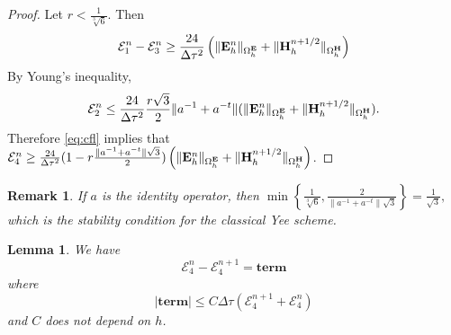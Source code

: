 \documentclass[12pt,reqno]{amsart}
\newcommand{\e}{{\bf E}}
\newcommand{\h}{{\bf H}}
\newtheorem{lem}[theorem]{Lemma}
\newtheorem{remark}[theorem]{Remark}
\theoremstyle{definition}
\numberwithin{equation}{section}
\def\Gwh{\Omega_h}
\begin{document}
\begin{proof}
Let $r<\frac{1}{\sqrt[3]{6}}$.
Then $$\mathcal{E}_1^n-\mathcal{E}_3^n\geq
\frac{24}{\Delta \tau^2}\left ( \|\e_h^n\|_{\Gwh^\e}+\|\h_h^{n+1/2}\|_{\Gwh^\h}\right)$$
By Young's inequality,
$$
\mathcal{E}_2^n\leq \frac{24}{\Delta \tau^2}\frac{r\sqrt{3}}{2}\|a^{-1}+a^{-t}\|(\|\e_h^n\|_{\Gwh^\e}+\|\h_h^{n+1/2}\|_{\Gwh^\h}).
$$
Therefore \eqref{eq:cfl} implies that
 $\mathcal{E}_4^n\geq\frac{24}{\Delta \tau^2} (1-r\frac{\|a^{-1}+a^{-t}\|\sqrt{3}}{2})\left ( \|\e_h^n\|_{\Gwh^\e}+\|\h_h^{n+1/2}\|_{\Gwh^\h}\right)$.
\end{proof}
\begin{remark}
	If $a$ is the identity operator, then 
	$\min \left \{  \frac{1}{\sqrt[3]{6}},\frac{2}{\|a^{-1}+a^{-t}\|\sqrt{3}}  \right \}=
	\frac{1}{\sqrt{3}},
	$
	which is the stability condition for the classical Yee scheme.
\end{remark}
\begin{lem}\label{lem:sec} 
	We have
	$$\mathcal{E}_4^n-
\mathcal{E}_4^{n+1}=
\mathbf{term}
$$
where 
$$
|\mathbf{term}|\leq C \Delta \tau(\mathcal{E}_4^{n+1}+\mathcal{E}_4^{n})
$$
and $C$ does not depend on $h$.
\end{lem}
\end{document}

